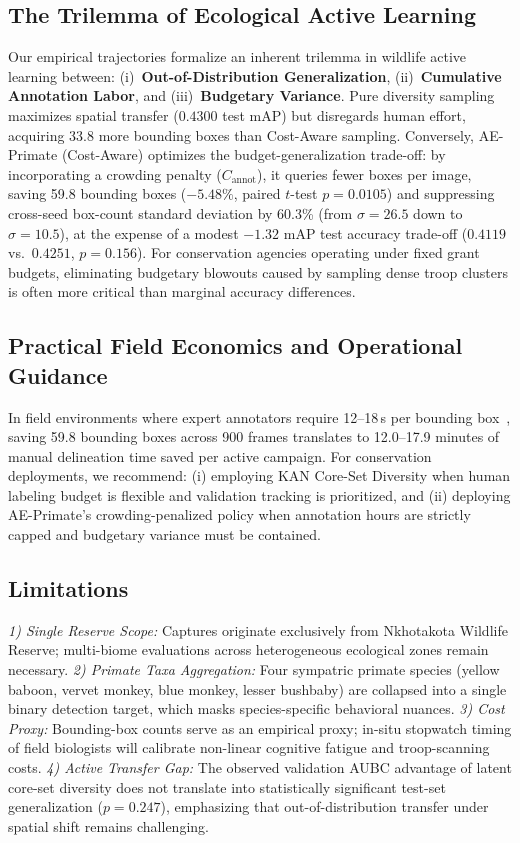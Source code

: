 \documentclass[conference]{IEEEtran}
\begin{document}
\subsection{The Trilemma of Ecological Active Learning}
Our empirical trajectories formalize an inherent trilemma in wildlife active learning between: (i)~\textbf{Out-of-Distribution Generalization}, (ii)~\textbf{Cumulative Annotation Labor}, and (iii)~\textbf{Budgetary Variance}. Pure diversity sampling maximizes spatial transfer ($0.4300$ test mAP) but disregards human effort, acquiring 33.8 more bounding boxes than Cost-Aware sampling. Conversely, AE-Primate (Cost-Aware) optimizes the budget-generalization trade-off: by incorporating a crowding penalty ($C_{\text{annot}}$), it queries fewer boxes per image, saving 59.8 bounding boxes ($-5.48\%$, paired $t$-test $p=0.0105$) and suppressing cross-seed box-count standard deviation by 60.3\% (from $\sigma=26.5$ down to $\sigma=10.5$), at the expense of a modest $-1.32$ mAP test accuracy trade-off ($0.4119$ vs.\ $0.4251$, $p = 0.156$). For conservation agencies operating under fixed grant budgets, eliminating budgetary blowouts caused by sampling dense troop clusters is often more critical than marginal accuracy differences.

\subsection{Practical Field Economics and Operational Guidance}
In field environments where expert annotators require 12--18\,s per bounding box~\cite{norouzzadeh2021deep,papadopoulos2017training}, saving 59.8 bounding boxes across 900 frames translates to 12.0--17.9 minutes of manual delineation time saved per active campaign. For conservation deployments, we recommend: (i) employing KAN Core-Set Diversity when human labeling budget is flexible and validation tracking is prioritized, and (ii) deploying AE-Primate's crowding-penalized policy when annotation hours are strictly capped and budgetary variance must be contained.

\subsection{Limitations}
\textit{1) Single Reserve Scope:} Captures originate exclusively from Nkhotakota Wildlife Reserve; multi-biome evaluations across heterogeneous ecological zones remain necessary. \textit{2) Primate Taxa Aggregation:} Four sympatric primate species (yellow baboon, vervet monkey, blue monkey, lesser bushbaby) are collapsed into a single binary detection target, which masks species-specific behavioral nuances. \textit{3) Cost Proxy:} Bounding-box counts serve as an empirical proxy; in-situ stopwatch timing of field biologists will calibrate non-linear cognitive fatigue and troop-scanning costs. \textit{4) Active Transfer Gap:} The observed validation AUBC advantage of latent core-set diversity does not translate into statistically significant test-set generalization ($p = 0.247$), emphasizing that out-of-distribution transfer under spatial shift remains challenging.
\end{document}
